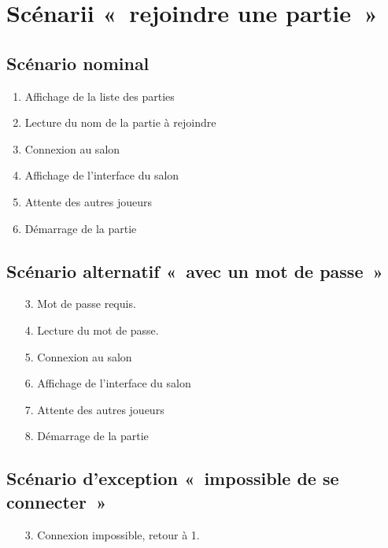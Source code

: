 \section{Scénarii « rejoindre une partie »}

\subsection{Scénario nominal}

\begin{enumerate}
    \item Affichage de la liste des parties
    \item Lecture du nom de la partie à rejoindre
    \item Connexion au salon
    \item Affichage de l'interface du salon
    \item Attente des autres joueurs
    \item Démarrage de la partie
\end{enumerate}

\subsection{Scénario alternatif « avec un mot de passe »}

\begin{itemize}
    \item[3.] Mot de passe requis.
    \item[4.] Lecture du mot de passe.
    \item[5.] Connexion au salon
    \item[6.] Affichage de l'interface du salon
    \item[7.] Attente des autres joueurs
    \item[8.] Démarrage de la partie
\end{itemize}

\subsection{Scénario d'exception « impossible de se connecter »}

\begin{itemize}
    \item[3.] Connexion impossible, retour à 1.
\end{itemize}

